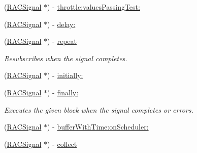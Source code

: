 \begin{DoxyCompactItemize}
\item 
(\mbox{\hyperlink{interface_r_a_c_signal}{R\+A\+C\+Signal}} $\ast$) -\/ \mbox{\hyperlink{category_r_a_c_signal_07_operations_08_a0310fbee83b4ca1b1daca25daf24f41b}{throttle\+:values\+Passing\+Test\+:}}
\item 
(\mbox{\hyperlink{interface_r_a_c_signal}{R\+A\+C\+Signal}} $\ast$) -\/ \mbox{\hyperlink{category_r_a_c_signal_07_operations_08_adc28e5c64d2e6ec8c5ab8465fa6c89b4}{delay\+:}}
\item 
\mbox{\label{category_r_a_c_signal_07_operations_08_a37268af56c884572c44827ba13367c2d}} 
(\mbox{\hyperlink{interface_r_a_c_signal}{R\+A\+C\+Signal}} $\ast$) -\/ \mbox{\hyperlink{category_r_a_c_signal_07_operations_08_a37268af56c884572c44827ba13367c2d}{repeat}}
\begin{DoxyCompactList}\small\item\em Resubscribes when the signal completes. \end{DoxyCompactList}\item 
(\mbox{\hyperlink{interface_r_a_c_signal}{R\+A\+C\+Signal}} $\ast$) -\/ \mbox{\hyperlink{category_r_a_c_signal_07_operations_08_a2c8566a5d3b5997357d34ee5991a2e0c}{initially\+:}}
\item 
\mbox{\label{category_r_a_c_signal_07_operations_08_ae07531acf550fb75812c77adfffc0bb7}} 
(\mbox{\hyperlink{interface_r_a_c_signal}{R\+A\+C\+Signal}} $\ast$) -\/ \mbox{\hyperlink{category_r_a_c_signal_07_operations_08_ae07531acf550fb75812c77adfffc0bb7}{finally\+:}}
\begin{DoxyCompactList}\small\item\em Executes the given block when the signal completes or errors. \end{DoxyCompactList}\item 
(\mbox{\hyperlink{interface_r_a_c_signal}{R\+A\+C\+Signal}} $\ast$) -\/ \mbox{\hyperlink{category_r_a_c_signal_07_operations_08_a7f0cb2086a2123f40552d2eab2a9cc54}{buffer\+With\+Time\+:on\+Scheduler\+:}}
\item 
(\mbox{\hyperlink{interface_r_a_c_signal}{R\+A\+C\+Signal}} $\ast$) -\/ \mbox{\hyperlink{category_r_a_c_signal_07_operations_08_a70b8f976dc0ece9b82e47cdb346a3a09}{collect}}
\item 
\mbox{\label{category_r_a_c_signal_07_operations_08_a0f359e9261777b7999c7229c105211ee}} 

\end{DoxyCompactItemize}
